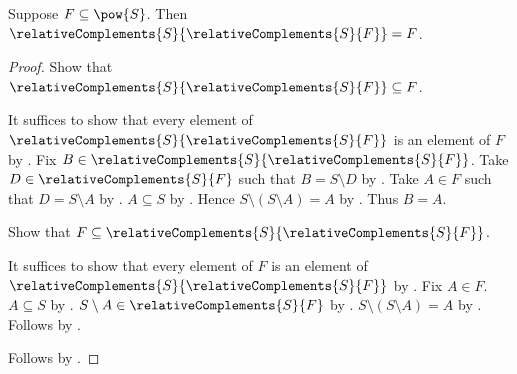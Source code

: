 \begin{proposition}\label{relative_complement_family_involutive}
    Suppose $F\subseteq\pow{S}$.
    Then $\relativeComplements{S}{\relativeComplements{S}{F}}=F$.
\end{proposition}
\begin{proof}
    Show that $\relativeComplements{S}{\relativeComplements{S}{F}}
        \subseteq F$.
    \begin{subproof}
        It suffices to show that every element of
            $\relativeComplements{S}{\relativeComplements{S}{F}}$
            is an element of $F$ by .
        Fix $B\in\relativeComplements{S}{\relativeComplements{S}{F}}$.
        Take $D\in\relativeComplements{S}{F}$ such that
            $B=S\setminus D$ by .
        Take $A\in F$ such that $D=S\setminus A$
            by .
        $A\subseteq S$ by .
        Hence $S\setminus(S\setminus A)=A$
            by .
        Thus $B=A$.
    \end{subproof}
    Show that $F\subseteq
        \relativeComplements{S}{\relativeComplements{S}{F}}$.
    \begin{subproof}
        It suffices to show that every element of $F$ is an element of
            $\relativeComplements{S}{\relativeComplements{S}{F}}$
            by .
        Fix $A\in F$.
        $A\subseteq S$ by .
        $S\setminus A\in\relativeComplements{S}{F}$
            by .
        $S\setminus(S\setminus A)=A$
            by .
        Follows by .
    \end{subproof}
    Follows by .
\end{proof}

